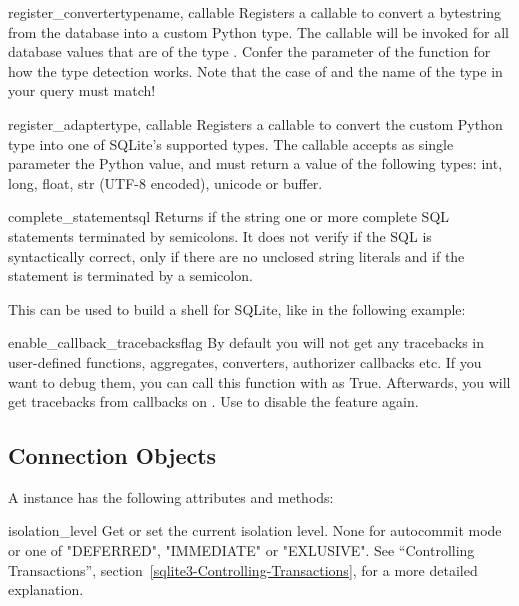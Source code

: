 \begin{funcdesc}{register_converter}{typename, callable}
Registers a callable to convert a bytestring from the database into a custom
Python type. The callable will be invoked for all database values that are of
the type . Confer the parameter  of the
 function for how the type detection works. Note that the case of
 and the name of the type in your query must match!
\end{funcdesc}

\begin{funcdesc}{register_adapter}{type, callable}
Registers a callable to convert the custom Python type  into one of
SQLite's supported types. The callable  accepts as single
parameter the Python value, and must return a value of the following types:
int, long, float, str (UTF-8 encoded), unicode or buffer.
\end{funcdesc}

\begin{funcdesc}{complete_statement}{sql}
Returns  if the string  one or more complete SQL
statements terminated by semicolons. It does not verify if the SQL is
syntactically correct, only if there are no unclosed string literals and if the
statement is terminated by a semicolon.

This can be used to build a shell for SQLite, like in the following example:

    
\end{funcdesc}

\begin{funcdesc}{enable_callback_tracebacks}{flag}
By default you will not get any tracebacks in user-defined functions,
aggregates, converters, authorizer callbacks etc. If you want to debug them,
you can call this function with  as True. Afterwards, you will get
tracebacks from callbacks on . Use  to disable
the feature again.
\end{funcdesc}

\subsection{Connection Objects \label{sqlite3-Connection-Objects}}

A  instance has the following attributes and methods:

\label{sqlite3-Connection-IsolationLevel}
\begin{memberdesc}{isolation_level}
  Get or set the current isolation level. None for autocommit mode or one of
  "DEFERRED", "IMMEDIATE" or "EXLUSIVE". See ``Controlling Transactions'', 
  section~\ref{sqlite3-Controlling-Transactions}, for a more detailed explanation.
\end{memberdesc}

